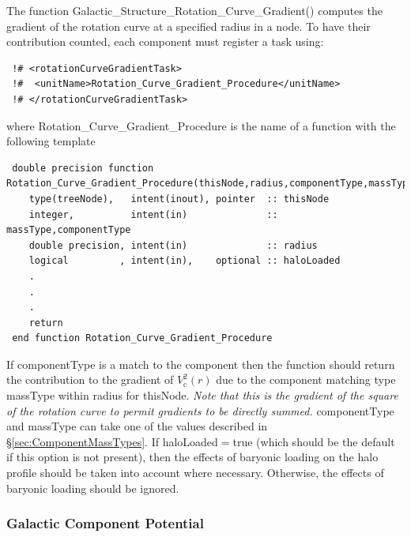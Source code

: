 The function {\normalfont \ttfamily Galactic\_Structure\_Rotation\_Curve\_Gradient()} computes the gradient of the rotation curve at a specified radius in a node. To have their contribution counted, each component must register a task using:
\begin{verbatim}
 !# <rotationCurveGradientTask>
 !#  <unitName>Rotation_Curve_Gradient_Procedure</unitName>
 !# </rotationCurveGradientTask>
\end{verbatim}
where {\normalfont \ttfamily Rotation\_Curve\_Gradient\_Procedure} is the name of a function with the following template
\begin{verbatim}
 double precision function Rotation_Curve_Gradient_Procedure(thisNode,radius,componentType,massType,haloLoaded)
    type(treeNode),   intent(inout), pointer  :: thisNode
    integer,          intent(in)              :: massType,componentType
    double precision, intent(in)              :: radius
    logical         , intent(in),    optional :: haloLoaded
    .
    .
    .
    return
 end function Rotation_Curve_Gradient_Procedure
\end{verbatim}
If {\normalfont \ttfamily componentType} is a match to the component then the function should return the contribution to the gradient of $V_{\mathrm c}^2(r)$ due to the component matching type {\normalfont \ttfamily massType} within {\normalfont \ttfamily radius} for {\normalfont \ttfamily thisNode}. \emph{Note that this is the gradient of the square of the rotation curve to permit gradients to be directly summed.} {\normalfont \ttfamily componentType} and {\normalfont \ttfamily massType} can take one of the values described in \S\ref{sec:ComponentMassTypes}. If {\normalfont \ttfamily haloLoaded}$=${\normalfont \ttfamily true} (which should be the default if this option is not present), then the effects of baryonic loading on the halo profile should be taken into account where necessary. Otherwise, the effects of baryonic loading should be ignored.

\subsubsection{Galactic Component Potential}

